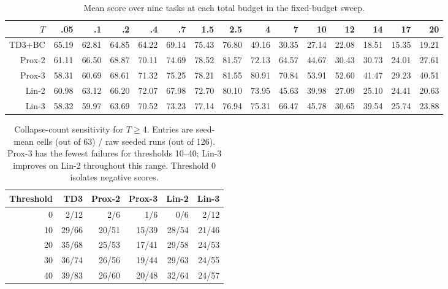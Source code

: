 \begin{table}[t]
\centering
\caption{Mean score over nine tasks at each total budget in the fixed-budget sweep.}
\label{tab:tau_means}
\scriptsize
\begin{tabular}{r|rrrrrrrrrrrrrr}
\toprule
$T$&.05&.1&.2&.4&.7&1.5&2.5&4&7&10&12&14&17&20\\
\midrule
TD3+BC&65.19&62.81&64.85&64.22&69.14&75.43&76.80&49.16&30.35&27.14&22.08&18.51&15.35&19.21\\
Prox-2&61.11&66.50&68.87&70.11&74.69&78.52&81.57&72.13&64.57&44.67&30.43&30.73&24.01&27.61\\
Prox-3&58.31&60.69&68.61&71.32&75.25&78.21&81.55&80.91&70.84&53.91&52.60&41.47&29.23&40.51\\
Lin-2&60.98&63.12&66.20&72.07&67.98&72.70&80.10&73.95&45.63&39.98&27.09&25.10&24.41&20.63\\
Lin-3&58.32&59.97&63.69&70.52&73.23&77.14&76.94&75.31&66.47&45.78&30.65&39.54&25.74&23.88\\
\bottomrule
\end{tabular}
\end{table}

\begin{table}[t]
\centering
\caption{Collapse-count sensitivity for $T\ge4$. Entries are seed-mean cells (out of 63) / raw seeded runs (out of 126). Prox-3 has the fewest failures for thresholds 10--40; Lin-3 improves on Lin-2 throughout this range. Threshold 0 isolates negative scores.}
\label{tab:collapse_sensitivity}
\scriptsize
\begin{tabular}{r|rrrrr}
\toprule
Threshold & TD3 & Prox-2 & Prox-3 & Lin-2 & Lin-3\\
\midrule
0  & 2/12  & 2/6  & 1/6  & 0/6  & 2/12\\
10 & 29/66 & 20/51 & 15/39 & 28/54&21/46\\
20 & 35/68 & 25/53 & 17/41 & 29/58&24/53\\
30 & 36/74 & 26/56 & 19/44 & 29/63&24/55\\
40 & 39/83 & 26/60 & 20/48 & 32/64&24/57\\
\bottomrule
\end{tabular}
\end{table}

